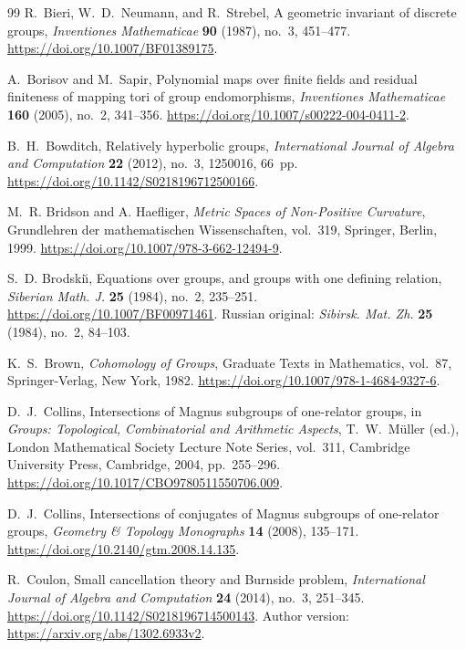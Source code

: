 \begin{thebibliography}{99}
R.~Bieri, W.~D.~Neumann, and R.~Strebel,
A geometric invariant of discrete groups,
\emph{Inventiones Mathematicae} \textbf{90} (1987), no.~3, 451--477.
\url{https://doi.org/10.1007/BF01389175}.

A.~Borisov and M.~Sapir,
Polynomial maps over finite fields and residual finiteness of mapping tori of group endomorphisms,
\emph{Inventiones Mathematicae} \textbf{160} (2005), no.~2, 341--356.
\url{https://doi.org/10.1007/s00222-004-0411-2}.

B.~H.~Bowditch,
Relatively hyperbolic groups,
\emph{International Journal of Algebra and Computation} \textbf{22} (2012), no.~3, 1250016, 66~pp.
\url{https://doi.org/10.1142/S0218196712500166}.

M.~R. Bridson and A. Haefliger,
\emph{Metric Spaces of Non-Positive Curvature},
Grundlehren der mathematischen Wissenschaften, vol.~319,
Springer, Berlin, 1999.
\url{https://doi.org/10.1007/978-3-662-12494-9}.

S.~D. Brodski\u{\i},
Equations over groups, and groups with one defining relation,
\emph{Siberian Math. J.} \textbf{25} (1984), no.~2, 235--251.
\url{https://doi.org/10.1007/BF00971461}.
Russian original: \emph{Sibirsk. Mat. Zh.} \textbf{25} (1984), no.~2, 84--103.

K.~S.~Brown,
\emph{Cohomology of Groups},
Graduate Texts in Mathematics, vol.~87,
Springer-Verlag, New York, 1982.
\url{https://doi.org/10.1007/978-1-4684-9327-6}.

D.~J.~Collins,
Intersections of Magnus subgroups of one-relator groups,
in \emph{Groups: Topological, Combinatorial and Arithmetic Aspects},
T.~W.~M\"uller (ed.), London Mathematical Society Lecture Note Series,
vol.~311, Cambridge University Press, Cambridge, 2004, pp.~255--296.
\url{https://doi.org/10.1017/CBO9780511550706.009}.

D.~J.~Collins,
Intersections of conjugates of Magnus subgroups of one-relator groups,
\emph{Geometry \& Topology Monographs} \textbf{14} (2008), 135--171.
\url{https://doi.org/10.2140/gtm.2008.14.135}.

R.~Coulon,
Small cancellation theory and Burnside problem,
\emph{International Journal of Algebra and Computation} \textbf{24} (2014), no.~3, 251--345.
\url{https://doi.org/10.1142/S0218196714500143}.
Author version: \url{https://arxiv.org/abs/1302.6933v2}.


\end{thebibliography}
